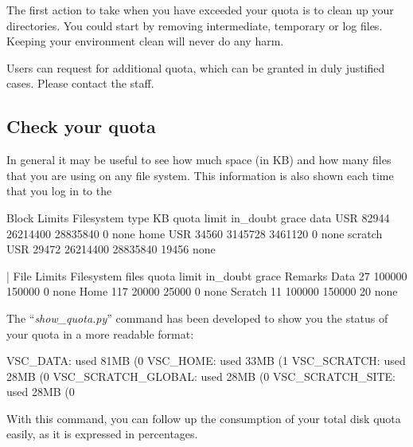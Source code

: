 \begin{tip}
The first action to take when you have exceeded your quota is
to clean up your directories. You could start by removing intermediate,
temporary or log files.  Keeping your environment clean will never do any harm.
\end{tip}

\begin{tip}
Users can request for additional quota, which can be granted in
duly justified cases. Please contact the \hpc staff.
\end{tip}

\subsection{Check your quota}

In general it may be useful to see how much space (in KB) and how many files
that you are using on any file system.  This information is also shown each
time that you log in to the \hpc

\begin{prompt}
                         Block Limits                                    
Filesystem   type     KB     quota     limit  in_doubt  grace
data          USR  82944  26214400  28835840         0   none
home          USR  34560   3145728   3461120         0   none
scratch       USR  29472  26214400  28835840     19456   none

|      File Limits
Filesystem  files   quota   limit in_doubt  grace  Remarks
Data           27  100000  150000        0   none
Home          117   20000   25000        0   none
Scratch        11  100000  150000       20   none
\end{prompt}

The ``\emph{show\_quota.py}'' command has been developed to show you the
status of your quota in a more readable format:

\begin{prompt}
VSC_DATA:    used 81MB (0%
VSC_HOME:    used 33MB (1%
VSC_SCRATCH:   used 28MB (0%
VSC_SCRATCH_GLOBAL: used 28MB (0%
VSC_SCRATCH_SITE:   used 28MB (0%
\end{prompt}

With this command, you can follow up the consumption of your total disk quota
easily, as it is expressed in percentages.


